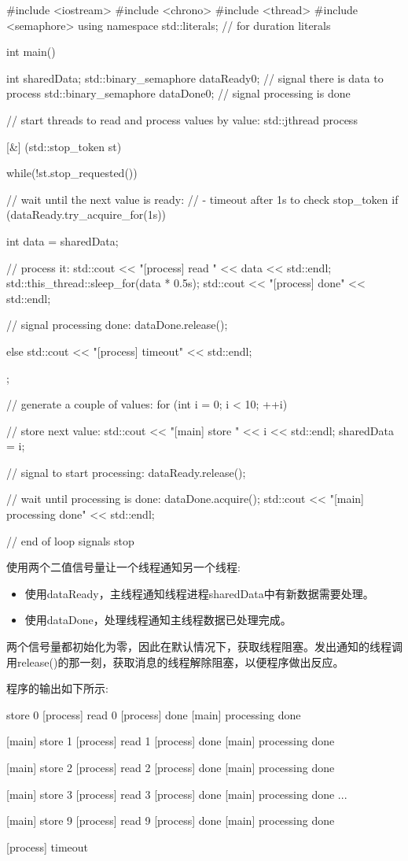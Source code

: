 
\begin{cpp}
#include <iostream>
#include <chrono>
#include <thread>
#include <semaphore>
using namespace std::literals; // for duration literals

int main()
{
	int sharedData;
	std::binary_semaphore dataReady{0}; // signal there is data to process
	std::binary_semaphore dataDone{0}; // signal processing is done

	// start threads to read and process values by value:
	std::jthread process{[&] (std::stop_token st) {
						while(!st.stop_requested()) {
							// wait until the next value is ready:
							// - timeout after 1s to check stop_token
							if (dataReady.try_acquire_for(1s)) {
								int data = sharedData;

								// process it:
								std::cout << "[process] read " << data << std::endl;
								std::this_thread::sleep_for(data * 0.5s);
								std::cout << "[process] done" << std::endl;

								// signal processing done:
								dataDone.release();
							}
							else {
								std::cout << "[process] timeout" << std::endl;
							}
							}
						}};

	// generate a couple of values:
	for (int i = 0; i < 10; ++i) {
		// store next value:
		std::cout << "[main] store " << i << std::endl;
		sharedData = i;

		// signal to start processing:
		dataReady.release();

		// wait until processing is done:
		dataDone.acquire();
		std::cout << "[main] processing done\n" << std::endl;
	}
	// end of loop signals stop
}
\end{cpp}

使用两个二值信号量让一个线程通知另一个线程:

\begin{itemize}
\item
使用dataReady，主线程通知线程进程sharedData中有新数据需要处理。

\item
使用dataDone，处理线程通知主线程数据已处理完成。
\end{itemize}

两个信号量都初始化为零，因此在默认情况下，获取线程阻塞。发出通知的线程调用release()的那一刻，获取消息的线程解除阻塞，以便程序做出反应。

程序的输出如下所示:

\begin{shell}
[main] store 0
[process] read 0
[process]      done
[main] processing done

[main] store 1
[process] read 1
[process]      done
[main] processing done

[main] store 2
[process] read 2
[process]      done
[main] processing done

[main] store 3
[process] read 3
[process]      done
[main] processing done
...

[main] store 9
[process] read 9
[process]      done
[main] processing done

[process] timeout
\end{shell}

